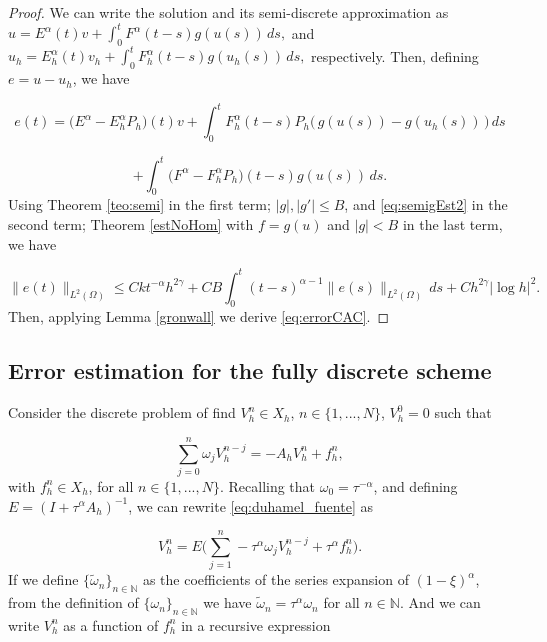 \documentclass{amsart}
\newcommand{\w}{\omega}
\newcommand{\wtilde}{\tilde{\w}}
\newcommand{\fmonio}{g}
\def\N{{\mathbb {N}}}
\theoremstyle{remark}
\theoremstyle{definition}
\numberwithin{equation}{section}
\begin{document}
\begin{proof}

We can write the solution and its semi-discrete approximation as 
$u = E^{\alpha}(t)v + \int^{t}_{0} F^{\alpha}(t-s)\fmonio(u(s)) \, ds,$
and
$u_h = E^{\alpha}_h(t)v_h + \int^{t}_{0} F^{\alpha}_h(t-s)\fmonio(u_h(s)) \, ds,$
respectively. Then, defining $e = u - u_h $, we have

$$e(t) = \big(E^{\alpha}-E^{\alpha}_hP_h\big)(t)v + \int^{t}_{0} F^{\alpha}_h(t-s)P_h\big( \,\fmonio(u(s)) - \fmonio(u_h(s))  \,\big)\,ds$$

$$+\int^{t}_{0} \big(F^{\alpha}-F^{\alpha}_hP_h\big)(t-s)\fmonio(u(s))\,ds. $$
Using Theorem \ref{teo:semi} in the first term; $|\fmonio|,|\fmonio'| \leq B$, and \eqref{eq:semigEst2} in the second term; Theorem \ref{estNoHom} with $f = \fmonio(u)$ and $|\fmonio|<B$ in the last term, we have 

$$\|e(t)\|_{L^2(\Omega)} \leq Ckt^{-\alpha}h^{2\gamma} + CB\int^{t}_0 (t-s)^{\alpha-1} \|e(s)\|_{L^2(\Omega)}\,ds + Ch^{2\gamma}|\log h|^2.$$
Then, applying Lemma \ref{gronwall} we derive \eqref{eq:errorCAC}. \end{proof}



\subsection{Error estimation for the fully discrete scheme}


Consider the discrete problem of find $V^n_h \in X_h$, $n \in \{1,...,N\}$, $V^0_h = 0$ such that  

\begin{equation}
\label{eq:duhamel_fuente}
        \sum^n_{j=0}\w_j V_h^{n-j}  = -  A_h V_h^n +  f^n_h, 
\end{equation}
with $f^n_h \in X_h$, for all $n \in \{1,...,N\}$. Recalling that $\w_0 = \tau^{-\alpha}$, and defining $E = (I + \tau^{\alpha} A_h)^{-1}$, we can rewrite \eqref{eq:duhamel_fuente} as


\begin{equation}
\label{eq:duhamel_fuente2}
          V_h^n    = E \Big( \sum^n_{j=1}-\tau^{\alpha}\w_j V_h^{n-j}+  \tau^{\alpha}f^n_h \Big). 
\end{equation}
If we define $\{\wtilde_n\}_{n \in \N}$ as the coefficients of the series expansion of $(1 - \xi)^{\alpha}$, from the definition  of $\{\w_n\}_{n \in \N}$ we have $\wtilde_n = \tau^{\alpha}\w_n$ for all $n \in \N$. And we can write $V^{n}_h$ as a function of $f^{n}_h$ in a recursive expression 
\end{document}

